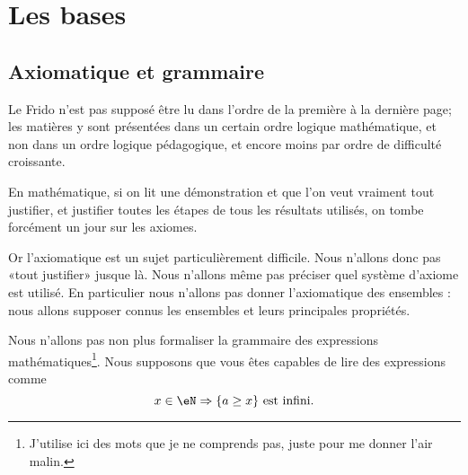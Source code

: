 
\section{Les bases}
\label{SECooIntroBases}

\subsection{Axiomatique et grammaire}
\label{SUBooTheorieEnsembles}
\begin{normaltext}\label{NorooFridoIntro1}
	Le Frido n'est pas supposé être lu dans l'ordre de la première à la dernière page; les matières y sont présentées dans un certain ordre logique mathématique, et non dans un ordre logique pédagogique, et encore moins par ordre de difficulté croissante.

	En mathématique, si on lit une démonstration et que l'on veut vraiment tout justifier, et justifier toutes les étapes de tous les résultats utilisés, on tombe forcément un jour sur les axiomes.

	Or l'axiomatique est un sujet particulièrement difficile. Nous n'allons donc pas «tout justifier» jusque là. Nous n'allons même pas préciser quel système d'axiome est utilisé. En particulier nous n'allons pas donner l'axiomatique des ensembles : nous allons supposer connus les ensembles et leurs principales propriétés.
\end{normaltext}

\begin{normaltext}\label{NorooFridoGrammaire}
	Nous n'allons pas non plus formaliser la grammaire des expressions mathématiques\footnote{J'utilise ici des mots que je ne comprends pas, juste pour me donner l'air malin.}. Nous supposons que vous êtes capables de lire des expressions comme
	\begin{equation}
		x\in \eN\Rightarrow\{ a\geq x \}\text{ est infini}.
	\end{equation}
\end{normaltext}

